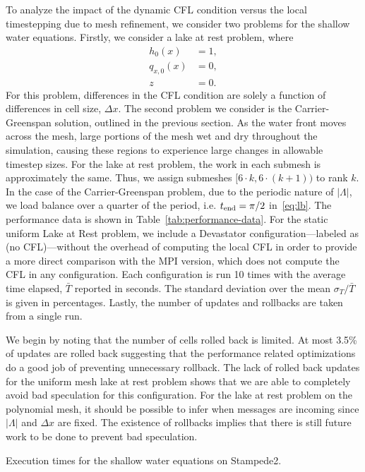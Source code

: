 To analyze the impact of the dynamic CFL condition versus the local timestepping due to mesh refinement, we consider two problems for the shallow water equations. Firstly, we consider a lake at rest problem, where
\begin{align*}
h_0(x) &= 1,\\
q_{x,0}(x) &= 0,\\
z &= 0.
\end{align*}
For this problem, differences in the CFL condition are solely a function of differences in cell size, $\Delta x$. The second problem we consider is the Carrier-Greenspan solution, outlined in the previous section. As the water front moves across the mesh, large portions of the mesh wet and dry throughout the simulation, causing these regions to experience large changes in allowable timestep sizes. For the lake at rest problem, the work in each submesh is approximately the same. Thus, we assign submeshes $[6\cdot k, 6 \cdot(k+1))$ to rank $k$. In the case of the Carrier-Greenspan problem, due to the periodic nature of $|\Lambda|$, we load balance over a quarter of the period, i.e. $t_{\text{end}}=\pi/2$ in~\eqref{eq:lb}. The performance data is shown in Table~\ref{tab:performance-data}. For the static uniform Lake at Rest problem, we include a Devastator configuration---labeled as (no CFL)---without the overhead of computing the local CFL in order to provide a more direct comparison with the MPI version, which does not compute the CFL in any configuration.  Each configuration is run 10 times with the average time elapsed, $\bar{T}$ reported in seconds. The standard deviation over the mean $\sigma_T/\bar{T}$ is given in percentages. Lastly, the number of updates and rollbacks are taken from a single run.  

We begin by noting that the number of cells rolled back is limited. At most 3.5\% of updates are rolled back suggesting that the performance related optimizations do a good job of preventing unnecessary rollback. The lack of rolled back updates for the uniform mesh lake at rest problem shows that we are able to completely avoid bad speculation for this configuration. For the lake at rest problem on the polynomial mesh, it should be possible to infer when messages are incoming since $|\Lambda|$ and $\Delta x$ are fixed. The existence of rollbacks implies that there is still future work to be done to prevent bad speculation.

\begin{table}
{\footnotesize
\caption{Execution times for the shallow water equations on Stampede2.}
\label{tab:performance-data}
  \centering

}
\end{table}


